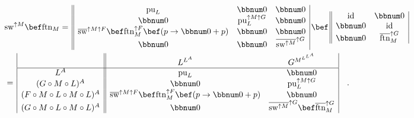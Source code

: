\begin{align*}
 & \text{sw}^{\uparrow M}\bef\text{ftn}_{M}=\,\begin{array}{||ccc|}
\text{pu}_{L} & \bbnum 0 & \bbnum 0\\
\bbnum 0 & \text{pu}_{L}^{\uparrow M\uparrow G} & \bbnum 0\\
\overline{\text{sw}}^{\uparrow M\uparrow F}\bef\text{ftn}_{M}^{\uparrow F}\bef(p\rightarrow\bbnum 0+p) & \bbnum 0 & \bbnum 0\\
\bbnum 0 & \bbnum 0 & \overline{\text{sw}^{\uparrow M}}^{\uparrow G}
\end{array}\,\bef\,\begin{array}{||cc|}
\text{id} & \bbnum 0\\
\bbnum 0 & \text{id}\\
\bbnum 0 & \overline{\text{ftn}}_{M}^{\uparrow G}
\end{array}\\
 & =\,\begin{array}{|c||cc|}
 & L^{L^{A}} & G^{M^{L^{L^{A}}}}\\
\hline L^{A} & \text{pu}_{L} & \bbnum 0\\
(G\circ M\circ L)^{A} & \bbnum 0 & \text{pu}_{L}^{\uparrow M\uparrow G}\\
(F\circ M\circ L\circ M\circ L)^{A} & \overline{\text{sw}}^{\uparrow M\uparrow F}\bef\text{ftn}_{M}^{\uparrow F}\bef(p\rightarrow\bbnum 0+p) & \bbnum 0\\
(G\circ M\circ L\circ M\circ L)^{A} & \bbnum 0 & \overline{\text{sw}^{\uparrow M}}^{\uparrow G}\bef\overline{\text{ftn}}_{M}^{\uparrow G}
\end{array}\quad.
\end{align*}

